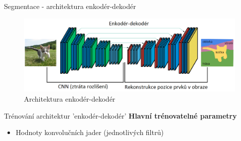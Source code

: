 \documentclass[aspectratio=1610]{beamer}
\begin{document}
\begin{frame}{Segmentace - architektura enkodér-dekodér}
\begin{figure}[h]
	\begin{center}
		\includegraphics[width=15cm, keepaspectratio]{segnet.png}
	\end{center}
	\caption{Architektura enkodér-dekodér} 	
\end{figure}
\end{frame}
\begin{frame}{Trénování architektur 'enkodér-dekodér'}
\textbf{Hlavní trénovatelné parametry}

\begin{itemize}
	\item Hodnoty konvolučních jader (jednotlivých filtrů)
	\vspace{5mm}		
	\begin{center}		
	\end{center}	
\end{itemize}

\end{frame}
\end{document}
